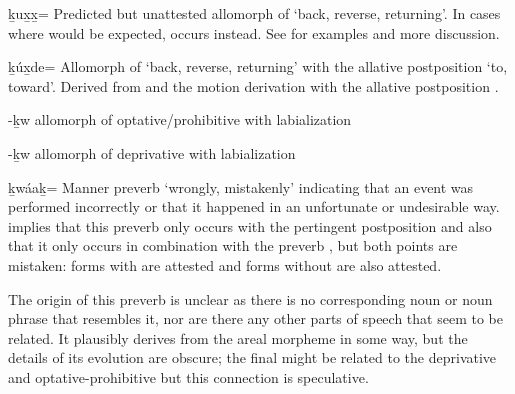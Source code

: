 \begin{morphdesc}[resume*=alphalist]
\item[\llap{*}ḵux̱x̱=]\label{m:ḵux̱x̱=}
	Predicted but unattested allomorph of  ‘back, reverse, returning’.
	In cases where  would be expected,  occurs instead.
	See  for examples and more discussion.

\item[ḵúx̱de=]\label{m:ḵúx̱de=}
	Allomorph of  ‘back, reverse, returning’
		with the allative postposition  ‘to, toward’.
	Derived from  and the motion derivation
		with the allative postposition .

\item[-ḵw]\label{m:-ḵw-optphib}
	allomorph of optative/prohibitive  with labialization

\item[-ḵw]\label{m:-ḵw-dprv}
	allomorph of deprivative  with labialization

\item[ḵwáaḵ=]\label{m:ḵwáaḵ=}
	Manner preverb ‘wrongly, mistakenly’ indicating that an event was performed incorrectly
		or that it happened in an unfortunate or undesirable way.
	\textcite[134, 297]{leer:1991} implies that this preverb
		only occurs with the pertingent postposition 
		and also that it only occurs in combination with the preverb ,
		but both points are mistaken: forms with  are attested
		and forms without  are also attested.
	
	The origin of this preverb is unclear as there is no corresponding noun or noun phrase
		that resembles it, nor are there any other parts of speech that seem to be related.
	It plausibly derives from the areal morpheme  in some way, but
		the details of its evolution are obscure; the final  might be related to
		the deprivative  and optative-prohibitive 
		but this connection is speculative.
	

\end{morphdesc}
